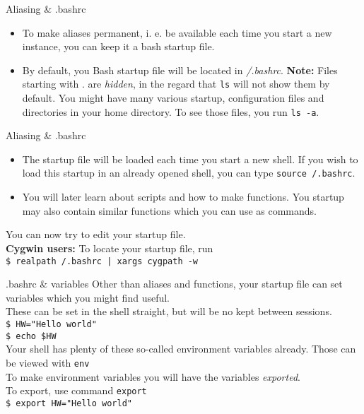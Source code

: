 \documentclass{beamer}
\let\tt\texttt
\let\bf\textbf
\let\it\itshape
\let\tilde\texttildelow
\begin{document}
\begin{frame}{Aliasing \& .bashrc}
        \begin{itemize}
                \item To make aliases permanent, i. e. be available each time you start a new instance, you can keep it a bash startup file.
                \item By default, you Bash startup file will be located in {\it{\tilde}/.bashrc}.
                \bf{Note:} Files starting with . are {\it hidden}, in the regard that \tt{ls} will not show them by default. You might have many various startup, configuration files and directories in your home directory. To see those files, you run \tt{ls -a}.
        \end{itemize}
\end{frame}

\begin{frame}{Aliasing \& .bashrc}
        \begin{itemize}
                \item The startup file will be loaded each time you start a new shell. If you wish to load this startup in an already opened shell, you can type \tt{source {\tilde}/.bashrc}.
                \item You will later learn about scripts and how to make functions. You startup may also contain similar functions which you can use as commands.
        \end{itemize}
        You can now try to edit your startup file. \\
        \bf{Cygwin users:} To locate your startup file, run \\
        \quad \tt{\$ realpath {\tilde}/.bashrc | xargs cygpath -w}
\end{frame}

\begin{frame}{.bashrc \& variables}
        Other than aliases and functions, your startup file can set variables which you might find useful. \\
        These can be set in the shell straight, but will be no kept between sessions. \\
        \tt{\$ HW="Hello world"}    \\
        \tt{\$ echo \$HW}           \\
        Your shell has plenty of these so-called environment variables already. Those can be viewed with \tt{env}   \\
        To make environment variables you will have the variables {\it exported}. \\
        To export, use command \tt{export} \\
        \tt{\$ export HW="Hello world"}    \\
\end{frame}
\end{document}
